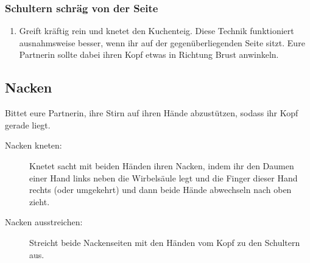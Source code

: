 \subsubsection{Schultern schräg von der Seite}

\begin{oframed}
  \begin{enumerate}
    \iftoggle{long}{
      \item \fett{Milchtritt/Tigerkrallen:} Krallt die Muskeln um die Schulterblätter.
      \item \fett{Zwischen Schulterblatt und Rippen:} Hebt das Schulterblatt und den Ellenbogen eurer Partnerin an und stützt diese mit einem Arm (und bei Bedarf mit eurem Knie). Massiert dann mit der Fingerspitzen mit viel Druck unter dem Schulterblatt entlang.
    }{}
    \item {} Greift kräftig rein und knetet den Kuchenteig. Diese Technik funktioniert ausnahmsweise besser, wenn ihr auf der gegenüberliegenden Seite sitzt. Eure Partnerin sollte dabei ihren Kopf etwas in Richtung Brust anwinkeln.
  \end{enumerate}
\end{oframed}

\pagebreak
\subsection{Nacken}

Bittet eure Partnerin, ihre Stirn auf ihren Hände abzustützen, sodass ihr Kopf gerade liegt.

\begin{description}
  \item[Nacken kneten:] Knetet sacht mit beiden Händen ihren Nacken, indem ihr den Daumen einer Hand links neben die Wirbelsäule legt und die Finger dieser Hand rechts (oder umgekehrt) und dann beide Hände abwechseln nach oben zieht.
  \item[Nacken ausstreichen:] Streicht beide Nackenseiten mit den Händen vom Kopf zu den Schultern aus.
\end{description}

